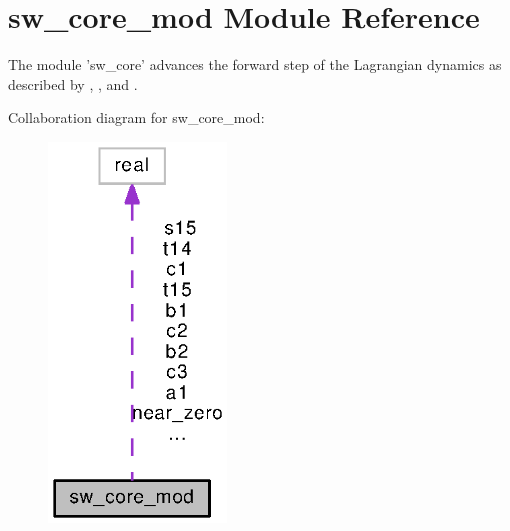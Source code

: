 \section{sw\-\_\-core\-\_\-mod Module Reference}
\label{classsw__core__mod}


The module 'sw\-\_\-core' advances the forward step of the Lagrangian dynamics as described by \cite{lin1997explicit}, \cite{lin2004vertically}, and \cite{harris2013two}.  




Collaboration diagram for sw\-\_\-core\-\_\-mod\-:
\nopagebreak
\begin{figure}[H]
\begin{center}
\leavevmode
\includegraphics[width=134pt]{classsw__core__mod__coll__graph}
\end{center}
\end{figure}
